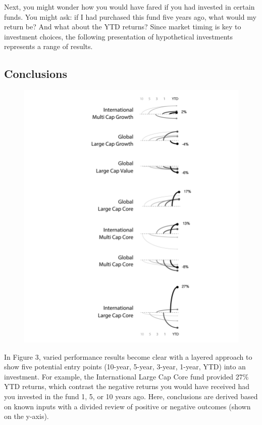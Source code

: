 \documentclass[]{book}
\theoremstyle{definition}
\theoremstyle{definition}
\theoremstyle{definition}
\theoremstyle{remark}
\begin{document}
Next, you might wonder how you would have fared if you had invested in
certain funds. You might ask: if I had purchased this fund five years
ago, what would my return be? And what about the YTD returns? Since
market timing is key to investment choices, the following presentation
of hypothetical investments represents a range of results.

\subsection{Conclusions}\label{conclusions}

\begin{figure}
\centering
\includegraphics{images/pattern-3.png}
\caption{}
\end{figure}

In Figure 3, varied performance results become clear with a layered
approach to show five potential entry points (10-year, 5-year, 3-year,
1-year, YTD) into an investment. For example, the International Large
Cap Core fund provided 27\% YTD returns, which contrast the negative
returns you would have received had you invested in the fund 1, 5, or 10
years ago. Here, conclusions are derived based on known inputs with a
divided review of positive or negative outcomes (shown on the y-axis).
\end{document}
